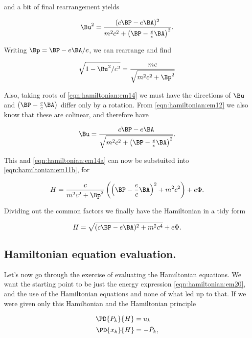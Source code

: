 and a bit of final rearrangement yields

\begin{align}\label{eqn:hamiltonian:em14}
\Bu^2 = \frac{(c \BP - e \BA)^2}{m^2 c^2 + {\left( \BP - \frac{e}{c} \BA \right)}^2}.
\end{align}

Writing $\Bp = \BP - e \BA/c$, we can rearrange and find

\begin{align}\label{eqn:hamiltonian:em14a}
\sqrt{1 - \Bu^2/c^2} = \frac{m c }{\sqrt{m^2 c^2 +\Bp^2}}
\end{align}

Also, taking roots of \ref{eqn:hamiltonian:em14} we must have the directions of $\Bu$ and $\left( \BP - \frac{e}{c} \BA \right)$ differ only by a rotation.  From \ref{eqn:hamiltonian:em12} we also know that these are colinear, and therefore have

\begin{align}\label{eqn:hamiltonian:em15}
\Bu = \frac{c \BP - e \BA}{\sqrt{m^2 c^2 + {\left( \BP - \frac{e}{c} \BA \right)}^2}}.
\end{align}

This and \ref{eqn:hamiltonian:em14a} can now be substuited into \ref{eqn:hamiltonian:em11b}, for

\begin{align}\label{eqn:hamiltonian:em11c}
H = \frac{c}{m^2 c^2 + \Bp^2} 
\left(
{\left(\BP - \frac{e}{c} \BA\right)}^2 + m^2 c^2 
\right)
+ e \Phi.
\end{align}

Dividing out the common factors we finally have the Hamiltonian in a tidy form

\begin{align}\label{eqn:hamiltonian:em20}
H = \sqrt{ (c \BP - e \BA)^2 + m^2 c^4 } + e\Phi.
\end{align}

\subsection{Hamiltonian equation evaluation.}

Let's now go through the exercise of evaluating the Hamiltonian equations.  We want the starting point to be just the energy expression \ref{eqn:hamiltonian:em20}, and the use of the Hamiltonian equations and none of what led up to that.  If we were given only this Hamiltonian and the Hamiltonian principle

\begin{subequations}
\begin{align}\label{eqn:hamiltonian:em21}
\PD{P_k}{H} &= u_k \\
\PD{x_k}{H} &= -\dot{P}_k,
\end{align}
\end{subequations}

